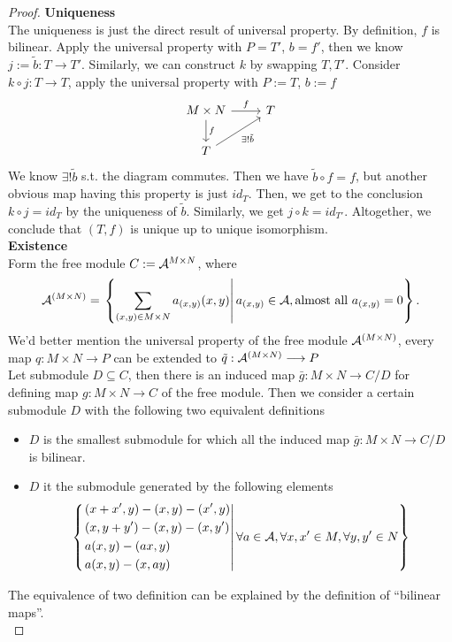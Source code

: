 \documentclass[11pt]{article}
\newcommand{\cala}{{\cal A}}
\newcommand{\rta}{\rightarrow}
\newcommand{\lrta}{\longrightarrow}
\begin{document}
\begin{proof}
\textbf{Uniqueness}\\
The uniqueness is just the direct result of universal property. By definition, $f$ is bilinear. Apply the universal property with $P=T'$, $b=f'$, then we know $j:=\tilde{b}:T\rta T'$. Similarly, we can construct $k$ by swapping $T,T'$. Consider $k\circ j:T\rta T$, apply the universal property with $P:=T$, $b:=f$
\[
\begin{tikzcd}
 M\times N \arrow[d,"f"] \ar[r,"f"] & T \\
T\arrow[swap,ur,"\exists !\tilde{b}"] &    
\end{tikzcd}
\] 
We know $\exists ! \tilde{b}$ s.t. the diagram commutes. Then we have $\tilde{b}\circ f=f$, but another obvious map having this property is just $id_T$. Then, we get to the conclusion $k\circ j=id_T$ by the uniqueness of $\tilde{b}$. Similarly, we get $j\circ k=id_{T'}$. Altogether, we conclude that $(T,f)$ is unique up to unique isomorphism.\\
\textbf{Existence}\\
Form the free module $C:=\cala^{M\times N}$, where 
$$
\cala^{(M\times N)}=\left.\left\{\sum_{(x,y)\in M\times N} a_{(x,y)}(x,y)\right|a_{(x,y)}\in \cala, \text{almost all $a_{(x,y)}=0$}\right\}.
$$
{\color{red}We'd better mention the universal property of the free module $\cala^{(M\times N)}$, every map $q:M\times N\lrta P$ can be extended to $\tilde{q}:\cala^{(M\times N)}\lrta P$}\\
Let submodule $D\subseteq C$, then there is an induced map $\bar{g}:M\times N\lrta C/D$ for defining map $g:M\times N\lrta C$ of the free module. Then we consider a certain submodule $D$ with the following two equivalent definitions
\begin{itemize}
\item $D$ is the smallest submodule for which all the induced map $\bar{g}:M\times N\lrta C/D$ is bilinear.
\item $D$ it the submodule generated by the following elements
$$
\left\{\left.
\begin{aligned}
&(x+x',y)-(x,y)-(x',y)\\
&(x,y+y')-(x,y)-(x,y')\\
&a(x,y)-(ax,y)\\
&a(x,y)-(x,ay)
\end{aligned}
\right|\forall a\in \cala, \forall x,x'\in M,\forall y,y'\in N
\right\}
$$
\end{itemize}   
The equivalence of two definition can be explained by the definition of ``bilinear maps''. \\

\end{proof}
\end{document}
